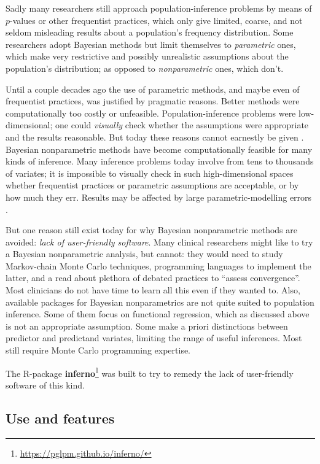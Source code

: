 Sadly many researchers still approach population-inference problems by means of $p$-values or other frequentist practices, which only give limited, coarse, and not seldom misleading results about a population's frequency distribution. Some researchers adopt Bayesian methods but limit themselves to \emph{parametric} ones, which make very restrictive and possibly unrealistic assumptions about the population's distribution; as opposed to \emph{nonparametric} ones, which don't.

Until a couple decades ago the use of parametric methods, and maybe even of frequentist practices, was justified by pragmatic reasons. Better methods were computationally too costly or unfeasible. Population-inference problems were low-dimensional; one could \emph{visually} check whether the assumptions were appropriate and the results reasonable. But today these reasons cannot earnestly be given \citep{walker2010}. Bayesian nonparametric methods have become computationally feasible for many kinds of inference. Many inference problems today involve from tens to thousands of variates; it is impossible to visually check in such high-dimensional spaces whether frequentist practices or parametric assumptions are acceptable, or by how much they err. Results may be affected by large parametric-modelling errors \citep{draper1995}.

But one reason still exist today for why Bayesian nonparametric methods are avoided: \emph{lack of user-friendly software}. Many clinical researchers might like to try a Bayesian nonparametric analysis, but cannot: they would need to study Markov-chain Monte Carlo techniques, programming languages to implement the latter, and a read about plethora of debated practices to ``assess convergence''. Most clinicians do not have time to learn all this even if they wanted to. Also, available packages for Bayesian nonparametrics are not quite suited to population inference. Some of them focus on functional regression, which as discussed above is not an appropriate assumption. Some make a priori distinctions between predictor and predictand variates, limiting the range of useful inferences. Most still require Monte Carlo programming expertise.

\medskip

The R-package \textbf{inferno}\footnote{\url{https://pglpm.github.io/inferno/}} was built to try to remedy the lack of user-friendly software of this kind.

\subsection*{Use and features}
\label{sec:features}

